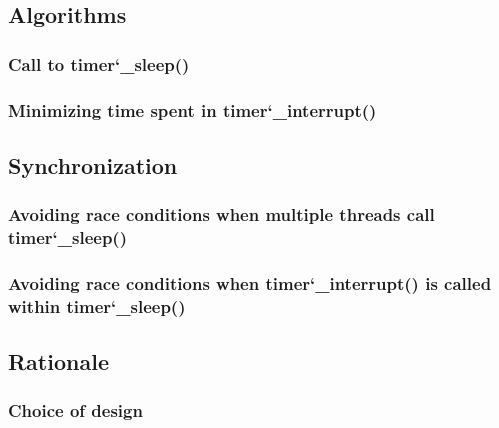 \documentclass{article}
\renewcommand{\_}{\char`_}
\begin{document}
\subsection{Algorithms}
\subsubsection{Call to timer\_sleep()}
\subsubsection{Minimizing time spent in timer\_interrupt()}
\subsection{Synchronization}
\subsubsection{Avoiding race conditions when multiple threads call timer\_sleep()}
\subsubsection{Avoiding race conditions when timer\_interrupt() is called within timer\_sleep()}
\subsection{Rationale}
\subsubsection{Choice of design}



\end{document}
